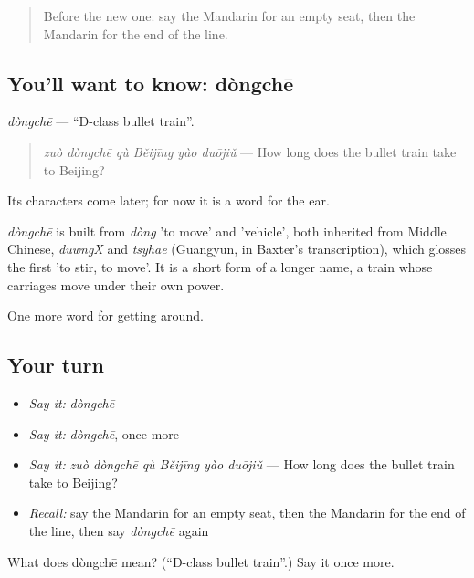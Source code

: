\label{lesson:ZH-C407-dongche}



\begin{quote}
Before the new one: say the Mandarin for an empty seat, then the Mandarin for the end of the line.
\end{quote}

\subsection*{You'll want to know: dòngchē}
\emph{dòngchē} — \textquotedblleft{}D-class bullet train\textquotedblright{}.

\begin{quote}
\emph{zuò dòngchē qù Běijīng yào duōjiǔ} — How long does the bullet train take to Beijing?
\end{quote}

Its characters come later; for now it is a word for the ear.

\begin{cousinweb}
\emph{dòngchē} is built from \emph{dòng} 'to move' and  'vehicle', both inherited from Middle Chinese, \emph{duwngX} and \emph{tsyhae} (Guangyun, in Baxter's transcription), which glosses the first 'to stir, to move'. It is a short form of a longer name, a train whose carriages move under their own power.
\end{cousinweb}

\begin{grammarlens}[title={What you've built}]
One more word for getting around.
\end{grammarlens}

\subsection*{Your turn}
\begin{itemize}
\raggedright
  \item \emph{Say it:} \emph{dòngchē}
  \item \emph{Say it:} \emph{dòngchē}, once more
  \item \emph{Say it:} \emph{zuò dòngchē qù Běijīng yào duōjiǔ} — How long does the bullet train take to Beijing?
  \item \emph{Recall:} say the Mandarin for an empty seat, then the Mandarin for the end of the line, then say \emph{dòngchē} again
\end{itemize}

\begin{tcolorbox}[breakable,colback=teal!4,colframe=teal!35!black,title={Before you move on}]
What does dòngchē mean? (\textquotedblleft{}D-class bullet train\textquotedblright{}.) Say it once more.
\end{tcolorbox}
